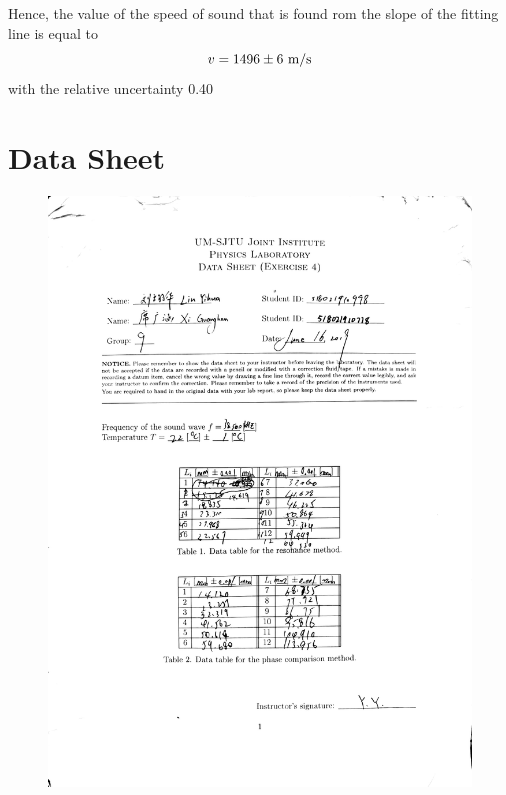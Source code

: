 \documentclass[a4paper]{report}
\begin{document}
	Hence, the value of the speed of sound that is found rom the slope of the fitting line is equal to
	\begin{equation*}
	v=1496\pm6\ \rm{m/s}
	\end{equation*}
	with the relative uncertainty 0.40%
	\section{Data Sheet}
	\begin{figure}[H]
		\centering
		\includegraphics[width=1\linewidth]{5.jpg}
	\end{figure}
\end{document}
